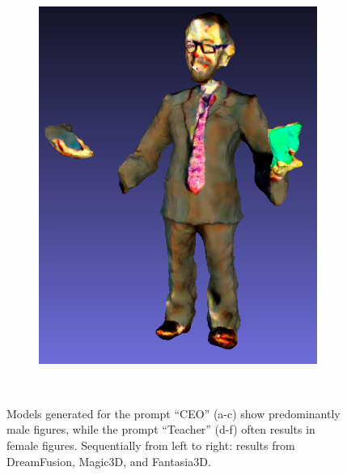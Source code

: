 \begin{figure}[H]
\begin{subfigure}[b]{0.1289\textwidth}
        \caption{}
    \end{subfigure}
    \begin{subfigure}[b]{0.2603\textwidth}
        \centering
        \includegraphics[width=\textwidth]{etc/bias/bias_teacher_fantasia3d.png}
        \caption{}
    \end{subfigure}
    \caption{Models generated for the prompt ``CEO'' (a-c) show predominantly male figures, while the prompt ``Teacher'' (d-f) often results in female figures. Sequentially from left to right: results from DreamFusion, Magic3D, and Fantasia3D.}~\label{fig:biasCEOTeacher}
\end{figure}

